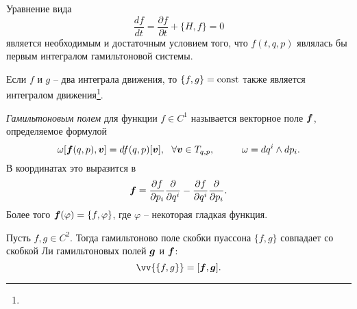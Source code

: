 \begin{to_lem} 
    Уравнение вида 
    \begin{equation*}
         \frac{d f}{d t} = \frac{\partial f}{\partial t} + \{H, f\} = 0
     \end{equation*} 
     является необходимым и достаточным условием того, что $f(t, q, p)$ являлась бы первым интегралом гамильтоновой системы.
\end{to_lem}

\begin{to_thr}
     Если $f$ и $g$ -- два интеграла движения, то $\{f, g\} = \text{const}$ также является интегралом движения\footnote{
     }.
\end{to_thr}

\begin{to_def} 
    \textit{Гамильтоновым полем} для функции $f \in C^1$ называется векторное поле $\mbox{\boldmath $f$}$, определяемое формулой
    \begin{equation*}
        \omega[ \mbox{\boldmath $f$}(q, p), \mbox{\boldmath $v$}] = df(q, p) [\mbox{\boldmath $v$}], \ \ \forall \mbox{\boldmath $v$} \in T_{q, p},
        \hspace{1cm} 
        \omega = dq^i \wedge dp_i.
    \end{equation*}
    В координатах это выразится в 
    \begin{equation*}
        \mbox{\boldmath $f$} = \frac{\partial f}{\partial p_i} \frac{\partial }{\partial q^i} - \frac{\partial f}{\partial q^i} \frac{\partial }{\partial p_i}.
    \end{equation*}
    Более того $\mbox{\boldmath $f$}(\varphi) = \{f, \varphi\}$, где $\varphi$ -- некоторая гладкая функция.
\end{to_def}

\begin{to_thr}
     Пусть $f, g \in C^2$. Тогда гамильтоново поле скобки пуассона $\{f, g\}$ совпадает со скобкой Ли гамильтоновых полей $\mbox{\boldmath $g$}$ и $\mbox{\boldmath $f$}$: 
     \begin{equation*}
         \vv{
         \{f, g\}
         } = [\vc{f}, \vc{g}].
     \end{equation*}
\end{to_thr}

